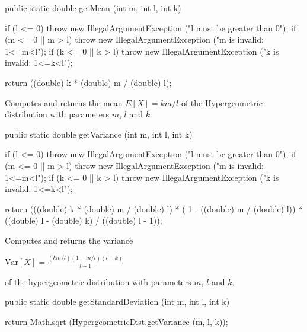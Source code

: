 \begin{code}

   public static double getMean (int m, int l, int k)\begin{hide} {
      if (l <= 0)
         throw new IllegalArgumentException ("l must be greater than 0");
      if (m <= 0 || m > l)
         throw new IllegalArgumentException ("m is invalid: 1<=m<l");
      if (k <= 0 || k > l)
         throw new IllegalArgumentException ("k is invalid: 1<=k<l");

      return ((double) k *  (double) m / (double) l);
   }\end{hide}
\end{code}
\begin{tabb}  Computes and returns the mean $E[X] = km/l$
   of the Hypergeometric distribution with parameters $m$, $l$ and $k$.
\end{tabb}
\begin{htmlonly}
\end{htmlonly}
\begin{code}

   public static double getVariance (int m, int l, int k)\begin{hide} {
      if (l <= 0)
         throw new IllegalArgumentException ("l must be greater than 0");
      if (m <= 0 || m > l)
         throw new IllegalArgumentException ("m is invalid: 1<=m<l");
      if (k <= 0 || k > l)
         throw new IllegalArgumentException ("k is invalid: 1<=k<l");

      return (((double) k * (double) m / (double) l) *
              ( 1 - ((double) m / (double) l)) * ((double) l - (double) k) /
              ((double) l - 1));
   }\end{hide}
\end{code}
\begin{tabb}  Computes and returns the variance
\begin{latexonly}
   $\mbox{Var}[X] = \frac{(km/l)(1 - m/l)(l - k)}{l - 1}$
\end{latexonly}
   of the hypergeometric distribution with parameters $m$, $l$ and $k$.
\end{tabb}
\begin{htmlonly}
\end{htmlonly}
\begin{code}

   public static double getStandardDeviation (int m, int l, int k)\begin{hide} {
      return Math.sqrt (HypergeometricDist.getVariance (m, l, k));
   }\end{hide}
\end{code}
